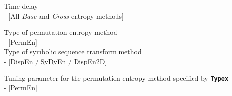\documentclass[12pt, a4paper, titlepage, openany]{book}
\begin{document}
\begin{description}[labelsep=1cm, labelwidth=2cm, nosep, style=multiline,leftmargin=3cm]
\item[\texttt{tau}]		Time delay  \\ - [All \textit{Base} and \textit{Cross-}entropy methods]\\
\item[\texttt{Typex}]		Type of permutation entropy method  \\ - [PermEn]\\
Type of symbolic sequence transform method  \\ - [DispEn / SyDyEn / DispEn2D]\\
\item[\texttt{tpx}]		Tuning parameter for the permutation entropy method specified by \texttt{\textbf{Typex}} \\ - [PermEn]



\end{description}
\end{document}
